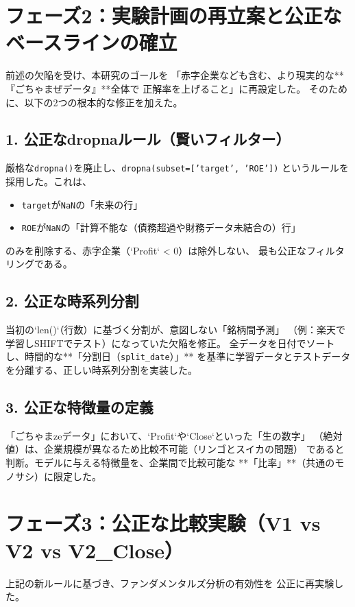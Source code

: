 \documentclass[a4paper, 11pt]{ltjsarticle}
\begin{document}
\section{フェーズ2：実験計画の再立案と公正なベースラインの確立}
前述の欠陥を受け、本研究のゴールを
「赤字企業なども含む、より現実的な**『ごちゃまぜデータ』**全体で
正解率を上げること」に再設定した。
そのために、以下の2つの根本的な修正を加えた。

\subsection*{1. 公正なdropnaルール（賢いフィルター）}
厳格な\texttt{dropna()}を廃止し、\texttt{dropna(subset=['target', 'ROE'])}
というルールを採用した。これは、
\begin{itemize}
    \item \texttt{target}が\texttt{NaN}の「未来の行」
    \item \texttt{ROE}が\texttt{NaN}の「計算不能な（債務超過や財務データ未結合の）行」
\end{itemize}
のみを削除する、赤字企業（`Profit` < 0）は除外しない、
最も公正なフィルタリングである。

\subsection*{2. 公正な時系列分割}
当初の`len()`（行数）に基づく分割が、意図しない「銘柄間予測」
（例：楽天で学習しSHIFTでテスト）になっていた欠陥を修正。
全データを日付でソートし、時間的な**「分割日（\texttt{split\_date}）」**
を基準に学習データとテストデータを分離する、正しい時系列分割を実装した。

\subsection*{3. 公正な特徴量の定義}
「ごちゃまzeデータ」において、`Profit`や`Close`といった「生の数字」
（絶対値）は、企業規模が異なるため比較不可能（リンゴとスイカの問題）
であると判断。モデルに与える特徴量を、企業間で比較可能な
**「比率」**（共通のモノサシ）に限定した。

\section{フェーズ3：公正な比較実験（V1 vs V2 vs V2\_Close）}
上記の新ルールに基づき、ファンダメンタルズ分析の有効性を
公正に再実験した。
\end{document}
